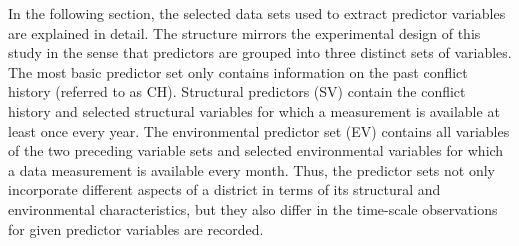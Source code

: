 \documentclass[a4paper,11pt]{article}
\begin{document}
In the following section, the selected data sets used to extract predictor variables
are explained in detail. The structure mirrors the experimental design of this study
in the sense that predictors are grouped into three distinct sets of variables.
The most basic predictor set only contains information on the past conflict history
(referred to as CH). Structural predictors (SV) contain the conflict history and
selected structural variables for which a measurement is available at least once
every year. The environmental predictor set (EV) contains all variables of the
two preceding variable sets and selected environmental variables for which a
data measurement is available every month. Thus, the predictor sets not only
incorporate different aspects of a district in terms of its structural and
environmental characteristics, but they also differ in the time-scale observations
for given predictor variables are recorded.

\newpage
\end{document}
